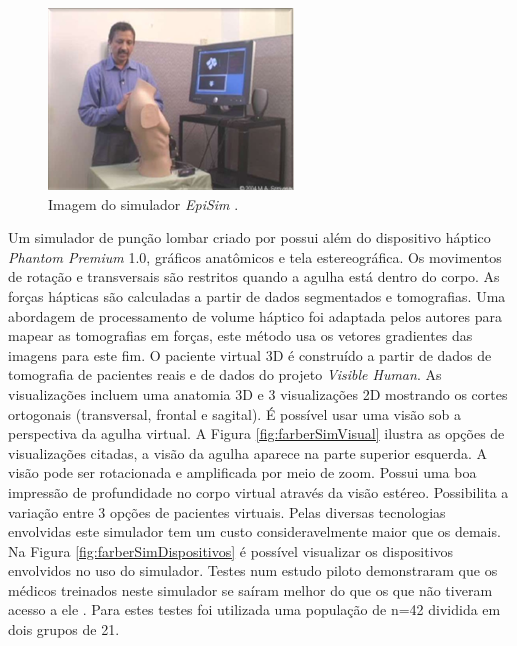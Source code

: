 \begin{figure}[ht!]
    \centering
    \includegraphics[width=0.4\linewidth]{capitulos/figuras/epiSim.png} 
    \caption{Imagem do simulador \textit{EpiSim} \cite{Frazzetto2011}.}
    \label{fig:epiSim}
\end{figure}

Um simulador de punção lombar criado por \cite{Farber2008,Farber2009} possui além do dispositivo háptico \textit{Phantom Premium} 1.0, gráficos anatômicos e tela estereográfica. Os movimentos de rotação e transversais são restritos quando a agulha está dentro do corpo. As forças hápticas são calculadas a partir de dados segmentados e tomografias. Uma abordagem de processamento de volume háptico \cite{Lundin2005} foi adaptada pelos autores para mapear as tomografias em forças, este método usa os vetores gradientes das imagens para este fim. O paciente virtual 3D é construído a partir de dados de tomografia de pacientes reais e de dados do projeto \textit{Visible Human}. As visualizações incluem uma anatomia 3D e 3 visualizações 2D mostrando os cortes ortogonais (transversal, frontal e sagital). É possível usar uma visão sob a perspectiva da agulha virtual. A Figura \ref{fig:farberSimVisual} ilustra as opções de visualizações citadas, a visão da agulha aparece na parte superior esquerda. A visão pode ser rotacionada e amplificada por meio de zoom. Possui uma boa impressão de profundidade no corpo virtual através da visão estéreo. Possibilita a variação entre 3 opções de pacientes virtuais. Pelas diversas tecnologias envolvidas este simulador tem um custo consideravelmente maior que os demais. Na Figura \ref{fig:farberSimDispositivos} é possível visualizar os dispositivos envolvidos no uso do simulador. Testes num estudo piloto demonstraram que os médicos treinados neste simulador se saíram melhor do que os que não tiveram acesso a ele \cite{Farber2009}. Para estes testes foi utilizada uma população de n=42 dividida em dois grupos de 21.

